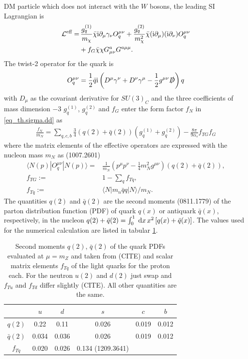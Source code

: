 DM particle which does not interact with the $W$ bosons, the leading SI Lagrangian is
\begin{align}
 \mathcal{L}^\text{eff} =&\, \frac{g_q^{(1)}}{m_\chi} \bar \chi\text{i} \partial_\mu \gamma_\nu O_q^{\mu\nu} + \frac{g_q^{(2)}}{m^2_\chi} \bar \chi(\text{i} \partial_\mu) (\text{i}\partial_\nu) O_q^{\mu\nu} \\
 \nonumber
 &+ f_G \bar \chi \chi G^a_{\mu\nu} G^{a\mu\mu}.
\end{align}
The twist-2 operator for the quark is
\begin{align}
 O_q^{\mu\nu} = \frac12 \bar q \text{i} \left(D^\mu \gamma^\nu + D^\nu \gamma^\mu - \frac12 g^{\mu\nu} \slashed{D}\right) q
\end{align}
with $D_\mu$ as the covariant derivative for $SU(3)_C$ and the three coefficients of mass dimension $-3$ $g_q^{(1)}$, $g_q^{(2)}$ and $f_G$ enter 
the form factor $f_N$ in \eqref{eq_th.sigma.dd} as
\begin{align}
 \frac{f_N}{m_N} = \sum\limits_{q,c,b} \frac34 \left(q(2)+\bar q(2)\right) \left(g_q^{(1)} + g_q^{(2)}\right) - \frac{8\pi}{9\alpha_s}f_{TG}f_G
 \label{eq_ddformfactorA}
\end{align}
where the matrix elements of the effective operators are expressed with the nucleon mass $m_N$ as (1007.2601)
\begin{subequations}
\begin{align}
 \langle N(p)| O_q^{\mu\nu} | N(p)\rangle =& \frac{1}{m_N}\left(p^\mu p^\nu - \frac14 m_N^2 g^{\mu\nu}\right) \left(q(2) + \bar q(2)\right),\\
 f_{TG} :=& 1- \sum\limits_q f_{Tq},\\
 f_{Tq} :=& \langle N|m_n \bar qq |N\rangle /m_N.
\end{align}
\end{subequations}
The quantities $q(2)$ and $\bar q(2)$ are the second moments (0811.1779) of the parton distribution function (PDF) of quark $q(x)$ or antiquark 
$\bar q(x)$, respectively, in the nucleon $q(2)+\bar q(2) = \int_0^1 \; \mathrm{d} x\, x^2 \left[q(x) + \bar q(x)\right]$. The values used for the numerical
calculation are listed in tabular \ref{tab_parton}.
\begin{table}[b]
 \begin{tabular}{c|ccccc}
   & $u$ & $d$ & $s$ & $c$ &$b$ \\
   \hline
  $q(2)$ & 0.22 & 0.11 & 0.026 & 0.019 & 0.012\\
  $\bar q(2)$ & 0.034 & 0.036 & 0.026 & 0.019 & 0.012\\
  $f_{Tq}$ & 0.020& 0.026 & 0.134 (1209.3641)\\
 \end{tabular}
\caption{Second moments $q(2)$, $\bar q(2)$ of the quark PDFs evaluated at $\mu=m_Z$ and taken from (CITE) and scalar matrix elements $f_{Tq}$ of 
the light quarks for the 
proton each. For the neutron $u(2)$ and $d(2)$ just swap and $f_{Tu}$ and $f_{Td}$ differ slightly (CITE). All other quantities are the same. }
\label{tab_parton}
\end{table}
